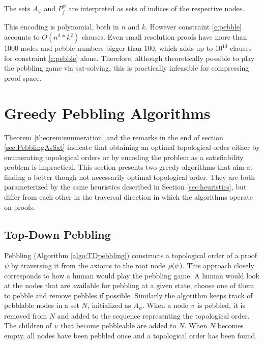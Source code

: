 \documentclass{llncs}
\newcommand{\Premises}[2]{P_{#1}^{#2}}
\newcommand{\Axioms}[1]{A_{#1}}
\begin{document}
The sets $\Axioms{\psi}$ and $\Premises{j}{\psi}$ are interpreted as sets of indices of the respective nodes.

\noindent
This encoding is polynomial, both in $n$ and $k$. However constraint \ref{c:pebble} accounts to $O(n^3*k^2)$ clauses. Even small resolution proofs have more than $1000$ nodes and pebble numbers bigger than $100$, which adds up to $10^{13}$ clauses for constraint \ref{c:pebble} alone. Therefore, although theoretically possible to play the pebbling game via sat-solving, this is practically infeasible for compressing proof space.


\section{Greedy Pebbling Algorithms}
\label{sec:algorithms}

Theorem \ref{theorem:enumeration} and the remarks in the end of section \ref{sec:PebblingAsSat} indicate that obtaining an optimal topological order either by enumerating topological orders or by encoding the problem as a satisfiability problem is impractical. This section presents two greedy algorithms that aim at finding a better though not necessarily optimal topological order. They are both parameterized by the same heuristics described in Section \ref{sec:heuristics}, but differ from each other in the traversal direction in which the algorithms operate on proofs.

\subsection{Top-Down Pebbling}

 Pebbling (Algorithm \ref{algo:TDpebbling}) constructs a topological order of a proof $\psi$ by traversing it from the axioms to the root node $\rho(\psi)$.
This approach closely corresponds to how a human would play the pebbling game. 
A human would look at the nodes that are available for pebbling at a given state, choose one of them to pebble and remove pebbles if possible.
Similarly the algorithm keeps track of pebblable nodes in a set $N$, initialized as $\Axioms{\psi}$.
When a node $v$ is pebbled, it is removed from $N$ and added to the sequence representing the topological order. The children of $v$ that become pebbleable are added to $N$.
When $N$ becomes empty, all nodes have been pebbled once and a topological order has been found.
\end{document}
